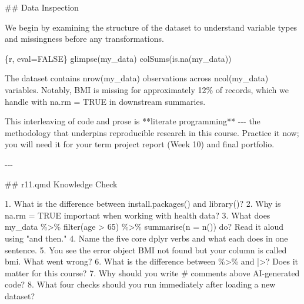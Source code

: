 \documentclass[
  letterpaper,
  DIV=11,
  numbers=noendperiod,
  oneside]{scrreprt}
\newenvironment{Shaded}{\begin{snugshade}}{\end{snugshade}}
\newcommand{\FunctionTok}[1]{\textcolor[rgb]{0.28,0.35,0.67}{#1}}
\newcommand{\InformationTok}[1]{\textcolor[rgb]{0.37,0.37,0.37}{#1}}
\newcommand{\NormalTok}[1]{\textcolor[rgb]{0.00,0.23,0.31}{#1}}
\newcommand{\SpecialStringTok}[1]{\textcolor[rgb]{0.13,0.47,0.30}{#1}}
\begin{document}
\begin{Shaded}
\begin{Highlighting}[numbers=left,,]
\FunctionTok{\#\# Data Inspection}

\NormalTok{We begin by examining the structure of the dataset to understand}
\NormalTok{variable types and missingness before any transformations.}

\InformationTok{\textasciigrave{}\textasciigrave{}\textasciigrave{}\{r, eval=FALSE\}}
\FunctionTok{glimpse}\NormalTok{(my\_data)}
\FunctionTok{colSums}\NormalTok{(}\FunctionTok{is.na}\NormalTok{(my\_data))}
\InformationTok{\textasciigrave{}\textasciigrave{}\textasciigrave{}}


\NormalTok{The dataset contains }\InformationTok{\textasciigrave{}nrow(my\_data)\textasciigrave{}}\NormalTok{ observations across}
\InformationTok{\textasciigrave{}ncol(my\_data)\textasciigrave{}}\NormalTok{ variables. Notably, BMI is missing for}
\NormalTok{approximately 12\% of records, which we handle with }\InformationTok{\textasciigrave{}na.rm = TRUE\textasciigrave{}}
\NormalTok{in downstream summaries.}

\NormalTok{This interleaving of code and prose is **literate programming** {-}{-}{-} the methodology that underpins reproducible research in this course. Practice it now; you will need it for your term project report (Week 10) and final portfolio.}

\NormalTok{{-}{-}{-}}

\FunctionTok{\#\# \textasciigrave{}r11.qmd\textasciigrave{} Knowledge Check}

\SpecialStringTok{1. }\NormalTok{What is the difference between }\InformationTok{\textasciigrave{}install.packages()\textasciigrave{}}\NormalTok{ and }\InformationTok{\textasciigrave{}library()\textasciigrave{}}\NormalTok{?}
\SpecialStringTok{2. }\NormalTok{Why is }\InformationTok{\textasciigrave{}na.rm = TRUE\textasciigrave{}}\NormalTok{ important when working with health data?}
\SpecialStringTok{3. }\NormalTok{What does }\InformationTok{\textasciigrave{}my\_data \%\textgreater{}\% filter(age \textgreater{} 65) \%\textgreater{}\% summarise(n = n())\textasciigrave{}}\NormalTok{ do? Read it aloud using "and then."}
\SpecialStringTok{4. }\NormalTok{Name the five core }\InformationTok{\textasciigrave{}dplyr\textasciigrave{}}\NormalTok{ verbs and what each does in one sentence.}
\SpecialStringTok{5. }\NormalTok{You see the error }\InformationTok{\textasciigrave{}object \textquotesingle{}BMI\textquotesingle{} not found\textasciigrave{}}\NormalTok{ but your column is called }\InformationTok{\textasciigrave{}bmi\textasciigrave{}}\NormalTok{. What went wrong?}
\SpecialStringTok{6. }\NormalTok{What is the difference between }\InformationTok{\textasciigrave{}\%\textgreater{}\%\textasciigrave{}}\NormalTok{ and }\InformationTok{\textasciigrave{}|\textgreater{}\textasciigrave{}}\NormalTok{? Does it matter for this course?}
\SpecialStringTok{7. }\NormalTok{Why should you write }\InformationTok{\textasciigrave{}\#\textasciigrave{}}\NormalTok{ comments above AI{-}generated code?}
\SpecialStringTok{8. }\NormalTok{What four checks should you run immediately after loading a new dataset?}


\end{Highlighting}
\end{Shaded}
\end{document}
